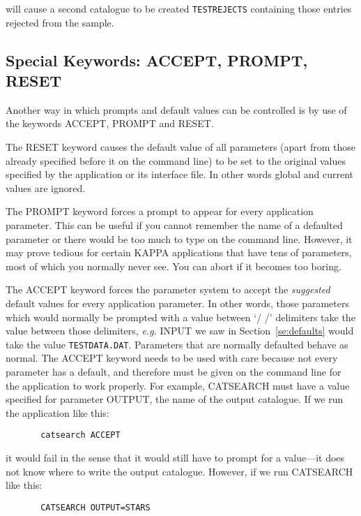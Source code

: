 will cause a second catalogue to be created {\tt TESTREJECTS} containing
those entries rejected from the sample.

\subsection{Special Keywords: ACCEPT, PROMPT, RESET}
\label{se:iclkey}

Another way in which prompts and default values can be controlled is by use of
the keywords ACCEPT, PROMPT and RESET.

The RESET keyword causes the default value of all parameters (apart from those
already specified before it on the command line) to be set to the original
values specified by the application or its interface file.  In other words
global and current values are ignored.

The PROMPT keyword forces a prompt to appear for every application parameter. 
This can be useful if you cannot remember the name of a defaulted parameter or
there would be too much to type on the command line.  However, it may prove
tedious for certain {\small KAPPA} applications that have tens of parameters,
most of which you normally never see.  You can abort if it becomes too boring.

The ACCEPT keyword forces the parameter system to accept the {\em suggested}
default values for every application parameter.  In other words, those
parameters which would normally be prompted with a value between `/ /'
delimiters take the value between those delimiters, {\it e.g.}  INPUT we saw in
Section~\ref{se:defaults} would take the value {\tt TESTDATA.DAT}.  Parameters
that are normally defaulted behave as normal.  The ACCEPT keyword needs to be
used with care because not every parameter has a default, and therefore must be
given on the command line for the application to work properly. For example,
CATSEARCH must have a value specified for parameter OUTPUT, the name of the
output catalogue. If we run the application like this:

\begin{verbatim}
       catsearch ACCEPT
\end{verbatim}

it would fail in the sense that it would still have to prompt for a value---it
does not know where to write the output catalogue. However, if we run CATSEARCH
like this:

\begin{verbatim}
       CATSEARCH OUTPUT=STARS 
\end{verbatim}

